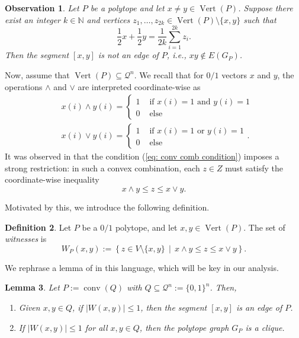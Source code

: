 \documentclass[11pt]{article}
\def\NN{{\mathbb N}}
\def\conv{\operatorname {conv}}
\def\Vert{\operatorname {Vert}}
\theoremstyle{definition}
\newtheorem{definition}{Definition}[section]
\theoremstyle{plain}
\newtheorem{obs}[definition]{Observation}
\newtheorem{lemma}[definition]{Lemma}
\begin{document}
\begin{obs} \label{obs: edges}
Let $P$ be a polytope and let $x \neq y \in \Vert(P)$. Suppose there exist an integer $k \in \NN$ and vertices $z_1, \ldots, z_{2k} \in \Vert(P) \setminus \{x, y\}$ such that
\[
\frac{1}{2}x + \frac{1}{2}y = \frac{1}{2k} \sum_{i=1}^{2k} z_i.
\]
Then the segment $[x,y]$ is not an edge of $P$, i.e., $xy \notin E(G_P)$.
\end{obs}

Now, assume that $\Vert(P) \subseteq \mathcal{Q}^n$. 
We recall that for $0/1$ vectors $x$ and $y$, the operations $\land$ and $\lor$ are interpreted coordinate-wise as 
\begin{align*}
&x(i) \land y(i) = 
    \begin{cases}
        1 & \text{ if } x(i) = 1 \text{ and } y(i) = 1 \\
        0 & \text{ else}
    \end{cases} \\
    & x(i) \lor y(i) = 
    \begin{cases}
        1 & \text{ if } x(i) = 1 \text{ or } y(i) = 1  \\
        0 & \text{ else}
    \end{cases}.
\end{align*}
It was observed in \cite{BondarenkoBrodskiiCliques} that the condition (\ref{eq: conv comb condition}) imposes a strong restriction: in such a convex combination, each $z \in Z$ must satisfy the coordinate-wise inequality
\[
x \land y \leq z \leq x \lor y.
\]

Motivated by this, we introduce the following definition. 
\begin{definition}Let $P $ be a $0/1$ polytope, and let $x,y\in \Vert(P)$. 
The set   of \emph{witnesses} is
\[
W_P(x, y) := \left\{ z \in V \setminus \{x, y\} \,\middle|\, x \land y \leq z \leq x \lor y \right\}.
\]
\end{definition}
We rephrase a lemma of \cite{BondarenkoBrodskiiCliques} in this language, which will be key in our analysis.

\begin{lemma}\cite[Lemma 1]{BondarenkoBrodskiiCliques}\label{lem: russian gadget}
Let $P := \conv(Q)$ with $Q \subseteq \mathcal{Q}^n := \{0,1\}^n$. Then,
\begin{enumerate}
    \item Given $x, y \in Q$, if $|W(x,y)| \leq 1$, then the segment $[x, y]$ is an edge of $P$.
    \item If $|W(x,y)| \leq 1$ for all $x, y \in Q$, then the polytope graph $G_P$ is a clique.
\end{enumerate}
\end{lemma}
\end{document}
